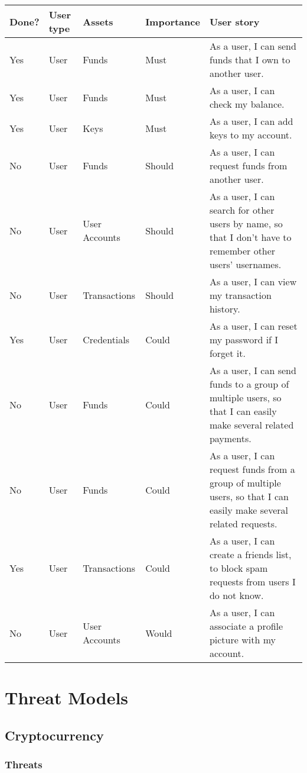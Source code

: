 \documentclass[12pt]{article}
\begin{document}
\begin{tabularx}{\linewidth}{|l|l|l|l|X|}
\hline
\textbf{Done?} & \textbf{User type} & \textbf{Assets} & \textbf{Importance} & \textbf{User story} \\
\hline
Yes & User & Funds & Must & As a user, I can send funds that I own to another user. \\
\hline
Yes & User & Funds & Must & As a user, I can check my balance. \\
\hline
Yes & User & Keys & Must & As a user, I can add keys to my account. \\
\hline
No & User & Funds & Should & As a user, I can request funds from another user. \\
\hline
No & User & User Accounts & Should & As a user, I can search for other users by name, so that I don't have to remember other users' usernames. \\
\hline
No & User & Transactions & Should & As a user, I can view my transaction history. \\
\hline
Yes & User & Credentials & Could & As a user, I can reset my password if I forget it. \\
\hline
No & User & Funds & Could & As a user, I can send funds to a group of multiple users, so that I can easily make several related payments. \\
\hline
No & User & Funds & Could & As a user, I can request funds from a group of multiple users, so that I can easily make several related requests. \\
\hline
Yes & User & Transactions & Could & As a user, I can create a friends list, to block spam requests from users I do not know. \\
\hline
No & User & User Accounts & Would & As a user, I can associate a profile picture with my account. \\
\hline
\end{tabularx}

\section{Threat Models}

\subsection{Cryptocurrency}

\subsubsection*{Threats}
\end{document}
